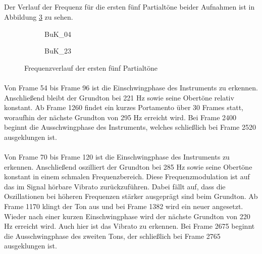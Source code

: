 \subsection{}
Der Verlauf der Frequenz für die ersten fünf Partialtöne beider Aufnahmen ist in Abbildung \ref{fig:freq} zu sehen.

\begin{figure}[H]
    \centering
    \begin{subfigure}{.5\textwidth}
        \centering
        \caption{BuK\_04}
        \scalebox{0.5}{}
        \label{fig:freq04}
    \end{subfigure}%
    \begin{subfigure}{.5\textwidth}
        \centering
        \caption{BuK\_23}
        \scalebox{0.5}{}
        \label{fig:freq23}
    \end{subfigure}
    \caption{Frequenzverlauf der ersten fünf Partialtöne}
    \label{fig:freq}
\end{figure}

\paragraph{}
Von Frame 54 bis Frame 96 ist die Einschwingphase des Instruments zu erkennen.
Anschließend bleibt der Grundton bei 221 Hz  sowie seine Obertöne relativ konstant.
Ab Frame 1260 findet ein kurzes Portamento über 30 Frames statt, woraufhin der nächste Grundton von 295 Hz erreicht wird.
Bei Frame 2400 beginnt die Ausschwingphase des Instruments, welches schließlich bei Frame 2520 ausgeklungen ist.

\paragraph{}
Von Frame 70 bis Frame 120 ist die Einschwingphase des Instruments zu erkennen.
Anschließend oszilliert der Grundton bei 285 Hz sowie seine Obertöne konstant in einem schmalen Frequenzbereich.
Diese Frequenzmodulation ist auf das im Signal hörbare Vibrato zurückzuführen.
Dabei fällt auf, dass die Oszillationen bei höheren Frequenzen stärker ausgeprägt sind beim Grundton.
Ab Frame 1170 klingt der Ton aus und bei Frame 1382 wird ein neuer angesetzt.
Wieder nach einer kurzen Einschwingphase wird der nächste Grundton von 220 Hz erreicht wird.
Auch hier ist das Vibrato zu erkennen.
Bei Frame 2675 beginnt die Ausschwingphase des zweiten Tons, der schließlich bei Frame 2765 ausgeklungen ist.


